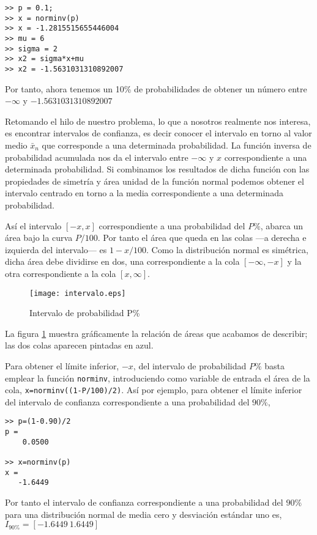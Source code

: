 \begin{verbatim}
>> p = 0.1;
>> x = norminv(p)
>> x = -1.2815515655446004
>> mu = 6
>> sigma = 2
>> x2 = sigma*x+mu
>> x2 = -1.5631031310892007
\end{verbatim}

Por tanto, ahora tenemos un 10\% de probabilidades de obtener un número entre $-\infty$ y $-1.5631031310892007$

Retomando el hilo de nuestro problema, lo que a nosotros realmente nos interesa, es encontrar intervalos de confianza, es decir conocer el intervalo en torno al valor medio $\bar{x}_n$ que corresponde a una determinada probabilidad. La función inversa de probabilidad acumulada nos da el intervalo entre $-\infty$ y $x$ correspondiente a una determinada probabilidad. Si combinamos los resultados de dicha función con las propiedades de simetría y área unidad de la función normal podemos obtener el intervalo centrado en torno a la media correspondiente a una determinada probabilidad.

Así el intervalo $[-x ,x]$ correspondiente a  una probabilidad del $P\%$, abarca un área bajo la curva $P/100$. Por tanto el área que queda en las colas ---a derecha e izquierda del intervalo--- es $1-x/100$. Como la distribución normal es simétrica, dicha área debe dividirse en dos, una correspondiente a la cola $[-\infty, -x]$ y la otra correspondiente a la cola $[x, \infty]$.

\begin{figure}[h]
\centering
\texttt{[image: intervalo.eps]}
\caption{Intervalo de probabilidad P\%}
\label{fig:intervalo}
\end{figure}
La figura \ref{fig:intervalo} muestra gráficamente la relación de áreas que acabamos de describir; las dos colas aparecen pintadas en azul. 


Para obtener el límite inferior, $-x$, del intervalo de probabilidad $P\%$ basta emplear la función \texttt{norminv}, introduciendo como variable de entrada el área de la cola, \texttt{x=norminv((1-P/100)/2)}. Así por ejemplo, para obtener el límite inferior del intervalo de confianza correspondiente a una probabilidad del $90\%$,

\begin{verbatim}
>> p=(1-0.90)/2
p =
    0.0500

>> x=norminv(p)
x =
   -1.6449
\end{verbatim}

Por tanto el intervalo de confianza correspondiente a una probabilidad del $90\%$ para una distribución normal de media cero y desviación estándar uno es, $I_{90\%} =[-1.6449\ 1.6449]$

